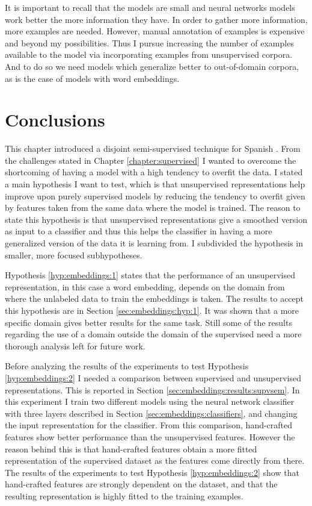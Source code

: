 It is important to recall that the models are small and neural networks models
work better the more information they have. In order to gather more
information, more examples are needed. However, manual annotation of examples
is expensive and beyond my possibilities. Thus I pursue increasing the number
of examples available to the model via incorporating examples from unsupervised
corpora. And to do so we need models which generalize better to out-of-domain
corpora, as is the case of models with word embeddings. 

\section{Conclusions}\label{sec:embeddings:conclusions}

This chapter introduced a disjoint semi-supervised technique for Spanish \vsd.
From the challenges stated in Chapter \ref{chapter:supervised} I wanted to
overcome the shortcoming of having a model with a high tendency to overfit the
data. I stated a main hypothesis I want to test, which is that unsupervised
representations help improve upon purely supervised models by reducing the
tendency to overfit given by features taken from the same data where the model
is trained. The reason to state this hypothesis is that unsupervised
representations give a smoothed version as input to a classifier and thus this
helps the classifier in having a more generalized version of the data it is
learning from. I subdivided the hypothesis in smaller, more focused
subhypotheses.

Hypothesis \ref{hyp:embeddings:1} states that the performance of an
unsupervised representation, in this case a word embedding, depends on the
domain from where the unlabeled data to train the embeddings is taken. The
results to accept this hypothesis are in Section
\ref{sec:embeddings:hyp:1}. It was shown that a more specific domain gives
better results for the same task. Still some of the results regarding the use
of a domain outside the domain of the supervised need a more thorough analysis
left for future work.

Before analyzing the results of the experiments to test Hypothesis
\ref{hyp:embeddings:2} I needed a comparison between supervised and
unsupervised representations. This is reported in Section
\ref{sec:embeddings:results:supvsem}. In this experiment I train two
different models using the neural network classifier with three layers
described in Section \ref{sec:embeddings:classifiers}, and changing the
input representation for the classifier. From this comparison, hand-crafted
features show better performance than the unsupervised features. However the
reason behind this is that hand-crafted features obtain a more fitted
representation  of the supervised dataset as the features come directly from
there. The results of the experiments to test Hypothesis
\ref{hyp:embeddings:2} show that hand-crafted features are strongly
dependent on the dataset, and that the resulting representation is highly
fitted to the training examples.

